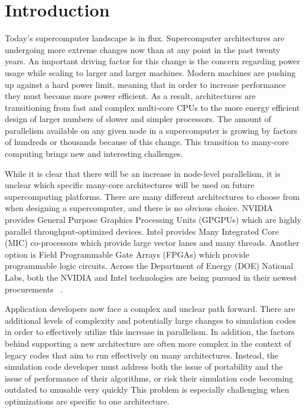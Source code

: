 \section{ \textbf{Introduction}}

Today's supercomputer landscape is in flux.
%
Supercomputer architectures are undergoing more extreme changes now than at any point in the past twenty years.
%
An important driving factor for this change is the concern regarding power usage while scaling to larger and larger machines.
%
Modern machines are pushing up against a hard power limit, meaning that in order to increase performance they must become more power efficient.
%
As a result, architectures are transitioning from fast and complex multi-core CPUs to the more energy efficient design of larger numbers of slower and simpler processors.
%
The amount of parallelism available on any given node in a supercomputer is growing by factors of hundreds or thousands because of this change.
%
This transition to many-core computing brings new and interesting challenges.
%

%
While it is clear that there will be an increase in node-level parallelism, it is unclear which specific many-core architectures will be used on future supercomputing platforms.
%
There are many different architectures to choose from when designing a supercomputer, and there is no obvious choice.
%
NVIDIA provides General Purpose Graphics Processing Units (GPGPUs) which are highly parallel throughput-optimized devices.
%
Intel provides Many Integrated Core (MIC) co-processors which provide large vector lanes and many threads.
%
Another option is Field Programmable Gate Arrays (FPGAs) which provide programmable logic circuits.
%
Across the Department of Energy (DOE) National Labs, both the NVIDIA and Intel technologies are being pursued in their newest procurements ~\cite{coralWeb, trinityWeb}.
%

Application developers now face a complex and unclear path forward.
%
There are additional levels of complexity and potentially large changes to simulation codes in order to effectively utilize this increase in parallelism.
%
In addition, the factors behind supporting a new architecture are often more complex in the context of legacy codes that aim to run effectively on many architectures.
%
Instead, the simulation code developer must address both the issue of portability and the issue of performance of their algorithms, or risk their simulation code becoming outdated to unusable very quickly
%
This problem is especially challenging when optimizations are specific to one architecture.
%

